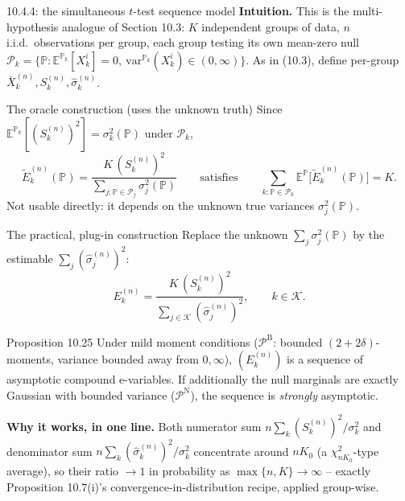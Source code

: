 \documentclass[aspectratio=169,10pt]{beamer}
\newcommand{\E}{\mathbb{E}}
\newcommand{\Pb}{\mathbb{P}}
\newcommand{\calK}{\mathcal{K}}
\newcommand{\calP}{\mathcal{P}}
\begin{document}
\begin{frame}[allowframebreaks]{10.4.4: the simultaneous $t$-test sequence model}
  \textbf{Intuition.} This is the multi-hypothesis analogue of Section 10.3: $K$ independent groups of data, $n$ i.i.d.\ observations per group, each group testing its own mean-zero null $\calP_k = \{\Pb : \E^{\Pb_k}[X_k^i]=0,\ \mathrm{var}^{\Pb_k}(X_k^i)\in(0,\infty)\}$. As in (10.3), define per-group $\bar X_k^{(n)}, S_k^{(n)}, \hat\sigma_k^{(n)}$.
  \begin{block}{The oracle construction (uses the unknown truth)}
    Since $\E^{\Pb_k}[(S_k^{(n)})^2] = \sigma_k^2(\Pb)$ under $\calP_k$,
    \[
      \tilde E_k^{(n)}(\Pb) = \frac{K\,(S_k^{(n)})^2}{\sum_{j:\Pb\in\calP_j} \sigma_j^2(\Pb)} \qquad \text{satisfies} \qquad \sum_{k:\Pb\in\calP_k}\E^{\Pb}\big[\tilde E_k^{(n)}(\Pb)\big] = K.
    \]
    Not usable directly: it depends on the unknown true variances $\sigma_j^2(\Pb)$.
  \end{block}

  \framebreak

  \begin{block}{The practical, plug-in construction}
    Replace the unknown $\sum_j \sigma_j^2(\Pb)$ by the estimable $\sum_{j} (\hat\sigma_j^{(n)})^2$:
    \[
      E_k^{(n)} = \frac{K\,(S_k^{(n)})^2}{\sum_{j\in\calK} (\hat\sigma_j^{(n)})^2}, \qquad k\in\calK.
    \]
  \end{block}
  \begin{block}{Proposition 10.25}
    Under mild moment conditions ($\calP^{\mathrm B}$: bounded $(2+2\delta)$-moments, variance bounded away from $0,\infty$), $(E_k^{(n)})$ is a sequence of asymptotic compound e-variables. If additionally the null marginals are exactly Gaussian with bounded variance ($\calP^{\mathrm N}$), the sequence is \emph{strongly} asymptotic.
  \end{block}
  \textbf{Why it works, in one line.} Both numerator sum $n\sum_k (S_k^{(n)})^2/\sigma_k^2$ and denominator sum $n\sum_k(\hat\sigma_k^{(n)})^2/\sigma_k^2$ concentrate around $nK_0$ (a $\chi^2_{nK_0}$-type average), so their ratio $\to1$ in probability as $\max\{n,K\}\to\infty$ -- exactly Proposition 10.7(i)'s convergence-in-distribution recipe, applied group-wise.
\end{frame}
\end{document}
